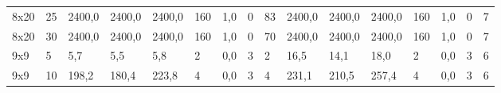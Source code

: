 \begin{table}[]
\begin{tabular}{llllllllllllllll}
		8x20    & 25     & 2400,0                                              & 2400,0                                              & 2400,0                                              & 160                                                 & 1,0                                                 & 0      & 83                                                        & 2400,0                                              & 2400,0                                              & 2400,0                                              & 160                                                 & 1,0                                                 & 0      & 7                                                         \\
		8x20    & 30     & 2400,0                                              & 2400,0                                              & 2400,0                                              & 160                                                 & 1,0                                                 & 0      & 70                                                        & 2400,0                                              & 2400,0                                              & 2400,0                                              & 160                                                 & 1,0                                                 & 0      & 7                                                         \\
		9x9     & 5      & 5,7                                                 & 5,5                                                 & 5,8                                                 & 2                                                   & 0,0                                                 & 3      & 2                                                         & 16,5                                                & 14,1                                                & 18,0                                                & 2                                                   & 0,0                                                 & 3      & 6                                                         \\
		9x9     & 10     & 198,2                                               & 180,4                                               & 223,8                                               & 4                                                   & 0,0                                                 & 3      & 4                                                         & 231,1                                               & 210,5                                               & 257,4                                               & 4                                                   & 0,0                                                 & 3      & 6                                                         \\

\end{tabular}
\end{table}
